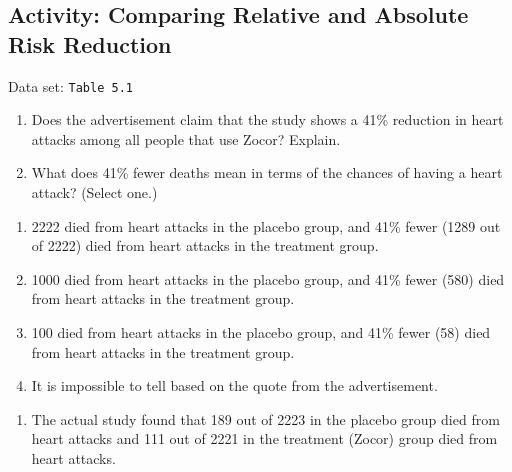 \documentclass[
]{book}
\providecommand{\tightlist}{%
  \setlength{\itemsep}{0pt}\setlength{\parskip}{0pt}}
\begin{document}
\hypertarget{activity-comparing-relative-and-absolute-risk-reduction}{%
\subsection*{Activity: Comparing Relative and Absolute Risk Reduction}\label{activity-comparing-relative-and-absolute-risk-reduction}}

Data set: \texttt{Table\ 5.1}

\begin{enumerate}
\def\labelenumi{\arabic{enumi}.}
\setcounter{enumi}{24}
\item
  Does the advertisement claim that the study shows a 41\% reduction in heart attacks among all people that use Zocor? Explain.
\item
  What does 41\% fewer deaths mean in terms of the chances of having a heart attack? (Select one.)\\
\end{enumerate}

\begin{enumerate}
\def\labelenumi{\alph{enumi}.}
\tightlist
\item
  2222 died from heart attacks in the placebo group, and 41\% fewer (1289 out of 2222) died from heart attacks in the treatment group.\\
\item
  1000 died from heart attacks in the placebo group, and 41\% fewer (580) died from heart attacks in the treatment group.\\
\item
  100 died from heart attacks in the placebo group, and 41\% fewer (58) died from heart attacks in the treatment group.\\
\item
  It is impossible to tell based on the quote from the advertisement.
\end{enumerate}

\begin{enumerate}
\def\labelenumi{\arabic{enumi}.}
\setcounter{enumi}{26}
\tightlist
\item
  The actual study found that 189 out of 2223 in the placebo group died from heart attacks and 111 out of 2221 in the treatment (Zocor) group died from heart attacks.\\
\end{enumerate}
\end{document}
